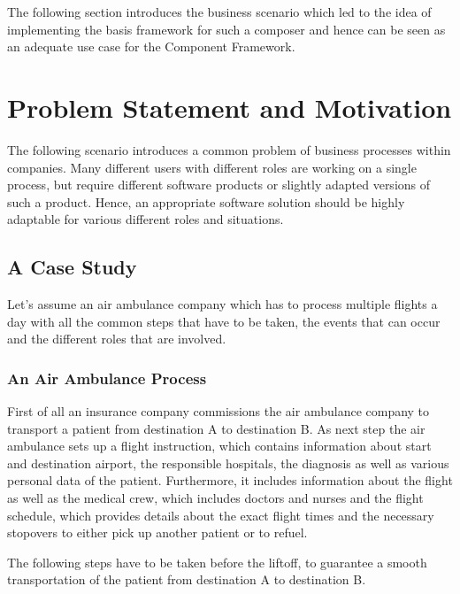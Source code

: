 The following section introduces the business scenario which led to the idea of implementing the
basis framework for such a composer and hence can be seen as an adequate use case for the Component
Framework.

\section{Problem Statement and Motivation}
\label{sec:scenario}

The following scenario introduces a common problem of business processes within companies. Many
different users with different roles are working on a single process, but require different software
products or slightly adapted versions of such a product. Hence, an appropriate software solution
should be highly adaptable for various different roles and situations.

\subsection{A Case Study}

Let's assume an air ambulance company which has to process multiple flights a day with all the
common steps that have to be taken, the events that can occur and the different roles that are involved.

\subsubsection{An Air Ambulance Process}

First of all an insurance company commissions the air ambulance company to transport a patient from
destination A to destination B. As next step the air ambulance sets up a flight instruction, which
contains information about start and destination airport, the responsible hospitals, the diagnosis as
well as various personal data of the patient. Furthermore, it includes information about the flight
as well as the medical crew, which includes doctors and nurses and the flight schedule, which
provides details about the exact flight times and the necessary stopovers to either pick up another
patient or to refuel.

The following steps have to be taken before the liftoff, to guarantee a smooth transportation of the
patient from destination A to destination B.

